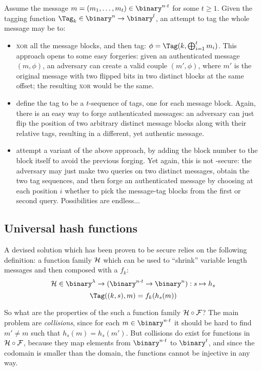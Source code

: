 Assume the message $m = (m_1, \dots, m_t) \in \binary^{n \cdot t}$ for some $t \geq 1$. Given the tagging function $\Tag_k \in \binary^n \to \binary^l$, an attempt to tag the whole message may be to:

\begin{itemize}    
    \item \textsc{xor} all the message blocks, and then tag: $\phi = \Tag(k, \bigxor_{i = 1}^{t} m_i)$. This approach opens to some easy forgeries: given an authenticated message $(m, \phi)$, an adversary can create a valid couple $(m', \phi)$, where $m'$ is the original message with two flipped bits in two distinct blocks at the same offset; the resulting \textsc{xor} would be the same.

    \item define the tag to be a $t$-sequence of tags, one for each message block. Again, there is an easy way to forge authenticated messages: an adversary can just flip the position of two arbitrary distinct message blocks along with their relative tags, resulting in a different, yet authentic message.

    \item attempt a variant of the above approach, by adding the block number to the block itself to avoid the previous forging. Yet again, this is not \ufcma-secure: the adversary may just make two queries on two distinct messages, obtain the two tag sequences, and then forge an authenticated message by choosing at each position $i$ whether to pick the message-tag blocks from the first or second query. Possibilities are endless...

\end{itemize}

\subsection{Universal hash functions}

A devised solution which has been proven to be secure relies on the following definition: a function family $\mathcal{H}$ which can be used to ``shrink'' variable length messages and then composed with a \prf{} $f_k$:
\[
   \H \in \binary^\lambda \to (\binary^{n \cdot t} \to \binary^n) : s \mapsto h_s
\]
\[
    \Tag((k, s), m) = f_k(h_s(m))
\]

So what are the properties of the such a function family $\mathcal{H} \circ \mathcal{F}$? The main problem are \emph{collisions}, since for each $m \in \binary^{n \cdot t}$ it should be hard to find $m' \neq m$ such that $h_s(m) = h_s(m')$. But collisions do exist for functions in $\mathcal{H} \circ \mathcal{F}$, because they map elements from $\binary^{n \cdot t} $ to $\binary^t$, and since the codomain is smaller than the domain, the functions cannot be injective in any way.

